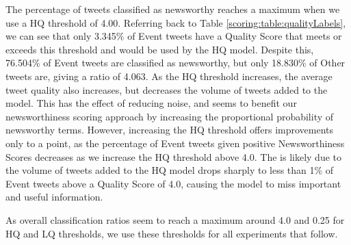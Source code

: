 The percentage of tweets classified as newsworthy reaches a maximum when we use a HQ threshold of 4.00.
Referring back to Table \ref{scoring:table:qualityLabels}, we can see that only 3.345\% of Event tweets have a Quality Score that meets or exceeds this threshold and would be used by the HQ model.
Despite this, 76.504\% of Event tweets are classified as newsworthy, but only 18.830\% of Other tweets are, giving a ratio of 4.063.
As the HQ threshold increases, the average tweet quality also increases, but decreases the volume of tweets added to the model.
This has the effect of reducing noise, and seems to benefit our newsworthiness scoring approach by increasing the proportional probability of newsworthy terms.
However, increasing the HQ threshold offers improvements only to a point, as the percentage of Event tweets given positive Newsworthiness Scores decreases as we increase the HQ threshold above 4.0.
The is likely due to the volume of tweets added to the HQ model drops sharply to less than 1\% of Event tweets above a Quality Score of 4.0, causing the model to miss important and useful information.

As overall classification ratios seem to reach a maximum around 4.0 and 0.25 for HQ and LQ thresholds, we use these thresholds for all experiments that follow.

